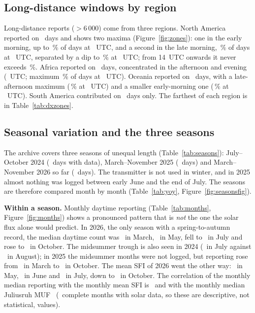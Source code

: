 \documentclass[10pt,a4paper]{article}
\begin{document}


\subsection{Long-distance windows by region}
Long-distance reports ($>$6\,000\km) come from three regions. North America reported on \daysNA\ days and shows two maxima (Figure~\ref{fig:zones}): one in the early morning, up to \naEarlyPct\,\% of days at \naEarlyH~UTC, and a second in the late morning, \peakpctnamerica\,\% of days at \peakhnamerica~UTC, separated by a dip to \naDipPct\,\% at \naDipH~UTC; from 14~UTC onwards it never exceeds \naLatePct\,\%. Africa reported on \daysAF\ days, concentrated in the afternoon and evening (\peakafrica~UTC; maximum \peakpctafrica\,\% of days at \peakhafrica~UTC). Oceania reported on \daysPA\ days, with a late-afternoon maximum (\paEvePct\,\% at \paEveH~UTC) and a smaller early-morning one (\paMornPct\,\% at \paMornH~UTC). South America contributed on \daysSA\ days only. The farthest of each region is in Table~\ref{tab:dxzones}.



\subsection{Seasonal variation and the three seasons}
\label{sec:seasons}
The archive covers three seasons of unequal length (Table~\ref{tab:seasons}): July--October 2024 (\yrCACEDays\ days with data), March--November 2025 (\yrCACFDays\ days) and March--November 2026 so far (\yrCACGDays\ days). The transmitter is not used in winter, and in 2025 almost nothing was logged between early June and the end of July. The seasons are therefore compared month by month (Table~\ref{tab:yoy}, Figure~\ref{fig:seasonsfig}).

\textbf{Within a season.} Monthly daytime reporting (Table~\ref{tab:months}, Figure~\ref{fig:months}) shows a pronounced pattern that is \emph{not} the one the solar flux alone would predict. In 2026, the only season with a spring-to-autumn record, the median daytime count was \monCACGAD\ in March, \monCACGAF\ in May, fell to \monCACGAH\ in July and rose to \monCACGBA\ in October. The midsummer trough is also seen in 2024 (\monCACEAH\ in July against \monCACEAI\ in August); in 2025 the midsummer months were not logged, but reporting rose from \monCACFAD\ in March to \monCACFBA\ in October. The mean SFI of 2026 went the other way: \monsfiCACGAF\ in May, \monsfiCACGAG\ in June and \monsfiCACGAH\ in July, down to \monsfiCACGBA\ in October. The correlation of the monthly median reporting with the monthly mean SFI is \corrMonSFI\ and with the monthly median Juliusruh MUF \corrMonMUF\ (\nFullSw\ complete months with solar data, so these are descriptive, not statistical, values).
\end{document}

